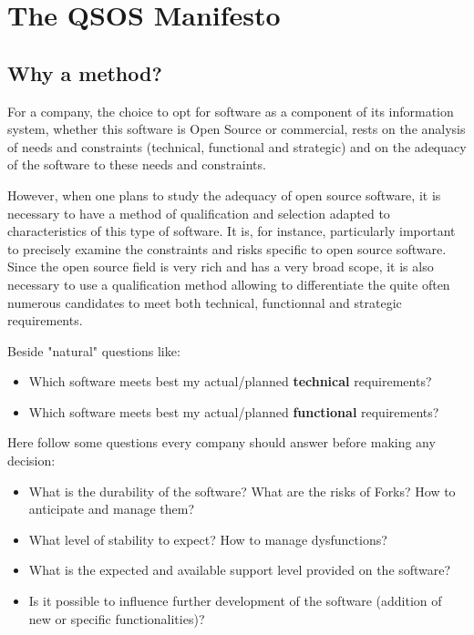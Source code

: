 %
\section{The QSOS Manifesto}

\subsection{Why a method?}
For a company, the choice to opt for software as a component of its information
system, whether this software is Open Source or commercial, rests on the
analysis of needs and constraints (technical, functional and strategic) and on the adequacy 
of the software to these needs and constraints.

However, when one plans to study the adequacy of open source software, it is necessary to have 
a method of qualification and selection adapted to characteristics of this type of software. 
It is, for instance, particularly important to precisely examine the constraints and risks 
specific to open source software. 
Since the open source field is very rich and has a very broad scope, it is also 
necessary to use a qualification method allowing to
differentiate the quite often numerous candidates to meet both technical, functionnal and strategic requirements.

Beside "natural" questions like:
\begin{itemize}
\item Which software meets best my actual/planned {\bf technical} requirements?
\item Which software meets best my actual/planned {\bf functional} requirements?
\end{itemize}

Here follow some questions every company should answer before making any decision:
\begin{itemize}
\item What is the durability of the software? What are the risks of Forks? How to anticipate and manage them?
\item What level of stability to expect? How to manage dysfunctions?
\item What is the expected and available support level provided on the software?
\item Is it possible to influence further development of the software (addition of new or specific functionalities)?
\end{itemize}


